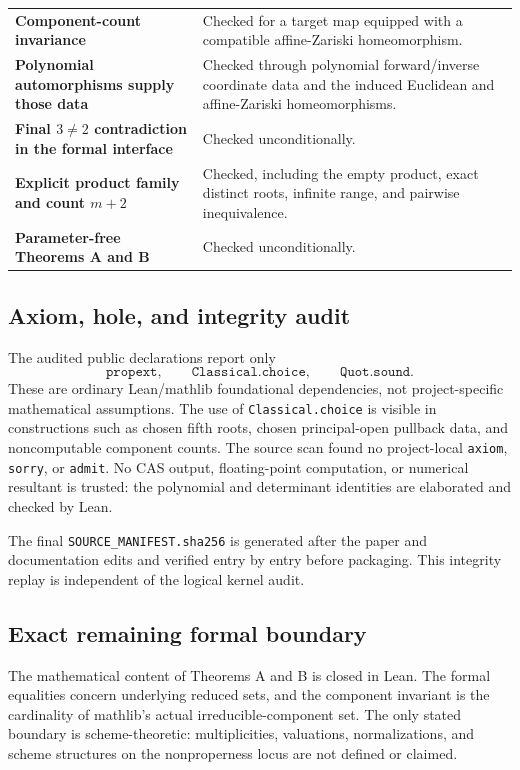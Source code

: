 \documentclass[11pt]{article}
\begin{document}
\begin{center}
\begin{tabularx}{\textwidth}{>{\raggedright\arraybackslash\bfseries}p{}X}
Component-count invariance & Checked for a target map equipped with a
compatible affine-Zariski homeomorphism. \\
Polynomial automorphisms supply those data & Checked through polynomial
forward/inverse coordinate data and the induced Euclidean and affine-Zariski
homeomorphisms. \\
Final $3\ne2$ contradiction in the formal interface & Checked
unconditionally. \\
Explicit product family and count $m+2$ & Checked, including the empty product,
exact distinct roots, infinite range, and pairwise inequivalence. \\
Parameter-free Theorems A and B & Checked unconditionally. \\
\bottomrule
\end{tabularx}
\end{center}

\subsection{Axiom, hole, and integrity audit}

The audited public declarations report only
\[
 \texttt{propext},\qquad
 \texttt{Classical.choice},\qquad
 \texttt{Quot.sound}.
\]
These are ordinary Lean/mathlib foundational dependencies, not
project-specific mathematical assumptions.  The use of
\texttt{Classical.choice} is visible in constructions such as chosen fifth
roots, chosen principal-open pullback data, and noncomputable component
counts.  The source scan found no project-local \texttt{axiom},
\texttt{sorry}, or \texttt{admit}.  No CAS output, floating-point computation,
or numerical resultant is trusted: the polynomial and determinant identities
are elaborated and checked by Lean.

The final \texttt{SOURCE\_MANIFEST.sha256} is generated after the paper and
documentation edits and verified entry by entry before packaging.  This
integrity replay is independent of the logical kernel audit.

\subsection{Exact remaining formal boundary}

The mathematical content of Theorems A and B is closed in Lean.  The formal
equalities concern underlying reduced sets, and the component invariant is the
cardinality of mathlib's actual irreducible-component set.  The only stated
boundary is scheme-theoretic: multiplicities, valuations, normalizations, and
scheme structures on the nonproperness locus are not defined or claimed.
\end{document}
